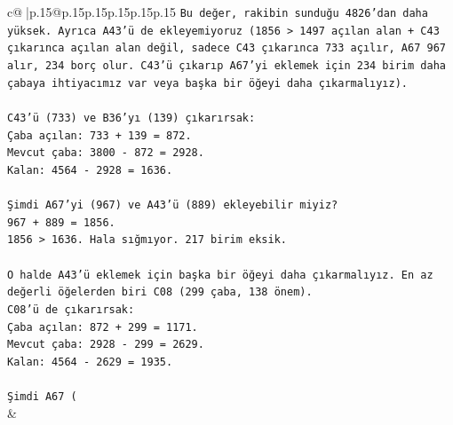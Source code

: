 \documentclass{article}
\begin{document}
{\begin{supertabular}{c@{$\;$}|p{.15\linewidth}@{}p{.15\linewidth}p{.15\linewidth}p{.15\linewidth}p{.15\linewidth}p{.15\linewidth}}
{{{\texttt{Bu değer, rakibin sunduğu 4826'dan daha yüksek. Ayrıca A43'ü de ekleyemiyoruz (1856 > 1497 açılan alan + C43 çıkarınca açılan alan değil, sadece C43 çıkarınca 733 açılır, A67 967 alır, 234 borç olur. C43'ü çıkarıp A67'yi eklemek için 234 birim daha çabaya ihtiyacımız var veya başka bir öğeyi daha çıkarmalıyız).} \\
\\ 
\texttt{C43'ü (733) ve B36'yı (139) çıkarırsak:} \\
\texttt{Çaba açılan: 733 + 139 = 872.} \\
\texttt{Mevcut çaba: 3800 {-} 872 = 2928.} \\
\texttt{Kalan: 4564 {-} 2928 = 1636.} \\
\\ 
\texttt{Şimdi A67'yi (967) ve A43'ü (889) ekleyebilir miyiz?} \\
\texttt{967 + 889 = 1856.} \\
\texttt{1856 > 1636. Hala sığmıyor. 217 birim eksik.} \\
\\ 
\texttt{O halde A43'ü eklemek için başka bir öğeyi daha çıkarmalıyız. En az değerli öğelerden biri C08 (299 çaba, 138 önem).} \\
\texttt{C08'ü de çıkarırsak:} \\
\texttt{Çaba açılan: 872 + 299 = 1171.} \\
\texttt{Mevcut çaba: 2928 {-} 299 = 2629.} \\
\texttt{Kalan: 4564 {-} 2629 = 1935.} \\
\\ 
\texttt{Şimdi A67 (} \\
            }
        }
    }
    & \\ \\


\end{supertabular}}
\end{document}
